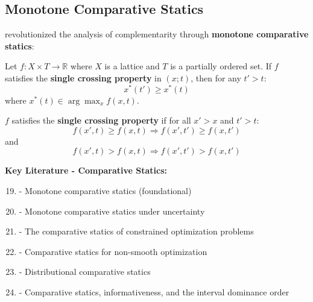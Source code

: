 \subsection{Monotone Comparative Statics}
\label{subsec:monotone-statics}

\citet{milgrom1994} revolutionized the analysis of complementarity through \textbf{monotone comparative statics}:

\begin{theorem}
\label{thm:milgrom-shannon}
Let $f: X \times T \to \mathbb{R}$ where $X$ is a lattice and $T$ is a partially ordered set. If $f$ satisfies the \textbf{single crossing property} in $(x; t)$, then for any $t' > t$:
\begin{equation}
x^*(t') \geq x^*(t)
\end{equation}
where $x^*(t) \in \arg\max_x f(x, t)$.
\end{theorem}

\begin{definition}
$f$ satisfies the \textbf{single crossing property} if for all $x' > x$ and $t' > t$:
\begin{equation}
f(x', t) \geq f(x, t) \Rightarrow f(x', t') \geq f(x, t')
\end{equation}
and
\begin{equation}
f(x', t) > f(x, t) \Rightarrow f(x', t') > f(x, t')
\end{equation}
\end{definition}

\textbf{Key Literature - Comparative Statics:}
\begin{enumerate}[noitemsep]
    \setcounter{enumi}{18}
    \item \citet{milgrom1994} - Monotone comparative statics (foundational)
    \item \citet{athey2002} - Monotone comparative statics under uncertainty
    \item \citet{quah2007} - The comparative statics of constrained optimization problems
    \item \citet{quah2009} - Comparative statics for non-smooth optimization
    \item \citet{jensen2018} - Distributional comparative statics
    \item \citet{strulovici2010} - Comparative statics, informativeness, and the interval dominance order
\end{enumerate}


